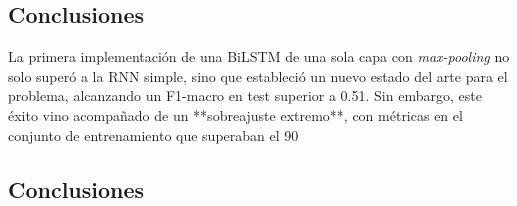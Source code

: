 \subsection{Conclusiones}

La primera implementación de una BiLSTM de una sola capa con \emph{max-pooling} no solo superó a la RNN simple, sino que estableció un nuevo estado del arte para el problema, alcanzando un F1-macro en test superior a 0.51. Sin embargo, este éxito vino acompañado de un **sobreajuste extremo**, con métricas en el conjunto de entrenamiento que superaban el 90%

\begin{table}[h!]
\centering
\caption{BiLSTM — Resumen de experimentos en MeIA (polaridad 1–5), transpuesto.}
\label{tab:lstm_meia_transposed}
\end{table}

\subsection{Conclusiones}

